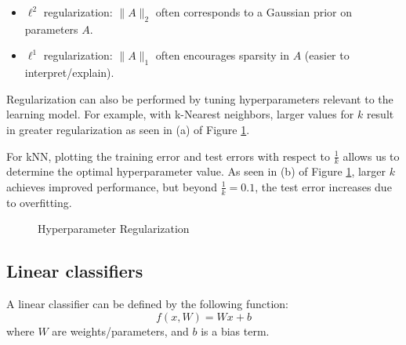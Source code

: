 \documentclass[twoside]{article}
\begin{document}
\begin{itemize}
\item $\ell^2$ regularization: $\|A\|_2$ often corresponds to a Gaussian prior on parameters $A$.

\item $\ell^1$ regularization: $\|A\|_1$ often encourages sparsity in $A$ (easier to interpret/explain).
\end{itemize}

Regularization can also be performed by tuning hyperparameters relevant to the learning model. For example, with k-Nearest neighbors, larger values for $k$ result in greater regularization as seen in (a) of Figure \ref{fig:hyper_parameters}.

For kNN, plotting the training error and test errors with respect to $\frac{1}{k}$ allows us to determine the optimal hyperparameter value. As seen in (b) of Figure \ref{fig:hyper_parameters}, larger $k$ achieves improved performance, but beyond $\frac{1}{k} = 0.1$, the test error increases due to overfitting.

\begin{figure}[!ht]%
    \centering
    \qquad
    \caption{Hyperparameter Regularization}%
    \label{fig:hyper_parameters}%
\end{figure}


\subsection{Linear classifiers}

A linear classifier can be defined by the following function:
$$f(x, W) = W x + b $$
where $W$ are weights/parameters, and $b$ is a bias term.
\end{document}
